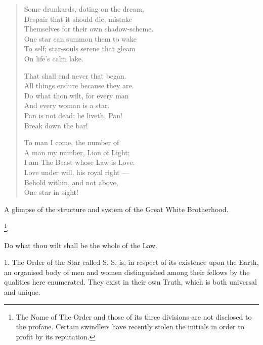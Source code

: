 \begin{verse}
  Some drunkards, doting on the dream, \\
  \hspace{1em}Despair that it should die, mistake \\
  Themselves for their own shadow-scheme. \\
  \hspace{1em}One star can summon them to wake \\
  To self; star-souls serene that gleam \\
  \hspace{1em}On life's calm lake. 

  That shall end never that began. \\
  \hspace{1em}All things endure because they are. \\
  Do what thon wilt, for every man \\
  \hspace{1em}And every woman is a star. \\
  Pan is not dead; he liveth, Pan! \\
  \hspace{1em}Break down the bar! 

  To man I come, the number of \\
  \hspace{1em}A man my number, Lion of Light; \\
  I am The Beast whose Law is Love. \\
  \hspace{1em}Love under will, his royal right --- \\
  Behold within, and not above, \\
  \hspace{1em}One star in sight! 
\end{verse}


A glimpse of the structure and system of the Great White Brotherhood.

\begin{center}
  \Argentium{}\footnote{The Name of The Order and those of its three divisions are not disclosed to the profane. Certain swindlers have recently stolen the initials \Argentium{} in order to profit by its reputation.}.
\end{center}

Do what thou wilt shall be the whole of the Law.

1. The Order of the Star called S. S. is, in respect of its existence upon the Earth, an organised body of men and women distinguished among their fellows by the qualities here enumerated. They exist in their own Truth, which is both universal and unique.

